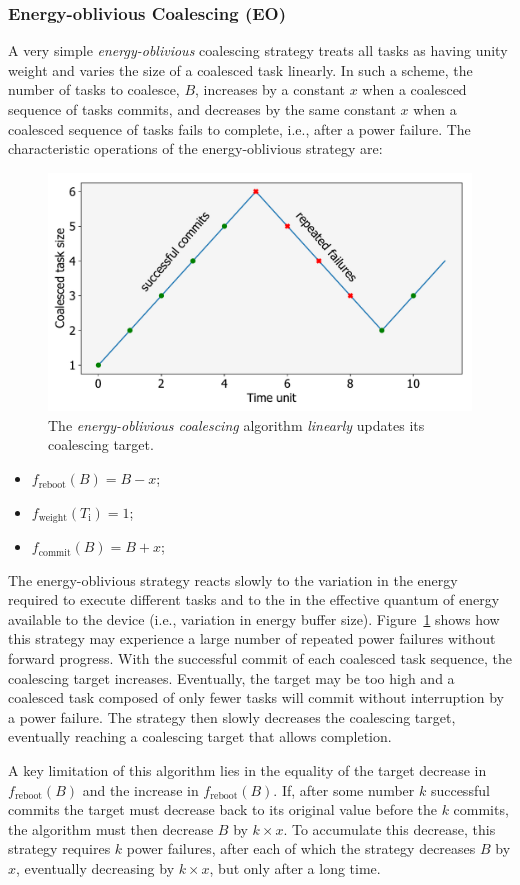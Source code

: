\subsubsection{Energy-oblivious Coalescing (EO)}
\label{subsec:energyBlind}

A very simple {\em energy-oblivious} coalescing strategy treats all tasks as
having unity weight and varies the size of a coalesced task linearly. In such a
scheme, the number of tasks to coalesce, $B$, increases by a constant $x$ when
a coalesced sequence of tasks commits, and decreases by the same constant $x$
when a coalesced sequence of tasks fails to complete, i.e., after a power
failure. The characteristic operations of the energy-oblivious strategy are: 

\begin{figure}
	\centering
	\includegraphics[width=0.3\columnwidth]{figures/slowCoal}
	\caption{The {\em energy-oblivious coalescing} algorithm \emph{linearly} updates its coalescing target.}
	\label{fig:energyBlind}
\end{figure}

\begin{itemize}
\item $f_\text{reboot}(B) = B - x $;
\item $f_\text{weight}(T_\text{i}) =  1$; 
\item $f_\text{commit}(B) = B + x$; 
\end{itemize}

The energy-oblivious strategy reacts slowly to the variation in the energy
required to execute different tasks and to the in the effective quantum of
energy available to the device (i.e., variation in energy buffer size). 
%
Figure~\ref{fig:energyBlind} shows how this strategy may experience a 
large number of repeated power failures without forward progress.
%
With the successful commit of each coalesced task sequence, the coalescing
target increases.  Eventually, the target may be too high and a coalesced task
composed of only fewer tasks will commit without interruption by a power
failure.
%
The strategy then slowly decreases the coalescing target, eventually reaching a
coalescing target that allows completion.
%

A key limitation of this algorithm lies in the equality of the target decrease
in $f_\text{reboot}(B)$ and the increase in $f_\text{reboot}(B)$.  If, after
some number $k$ successful commits the target must decrease back to its
original value before the $k$ commits, the algorithm must then decrease $B$ by
$k \times x$.  To accumulate this decrease, this strategy requires $k$ power
failures, after each of which the strategy decreases $B$ by $x$, eventually
decreasing by $k \times x$, but only after a long time. 

